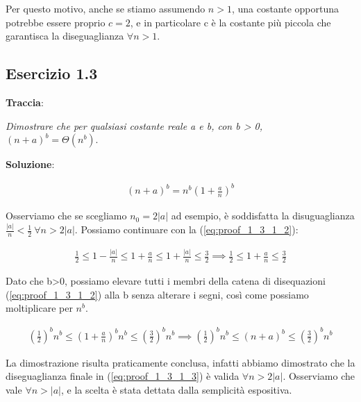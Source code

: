 \documentclass{article}
\begin{document}
\noindent
Per questo motivo, anche se stiamo assumendo $n>1$, una costante opportuna potrebbe essere proprio $c = 2$, e in particolare c è la costante più piccola che garantisca la diseguaglianza $\forall n>1$.

\subsection{Esercizio 1.3} \label{subsec:esercizio1_3}
\textbf{Traccia}:

\noindent
\textit{Dimostrare che per qualsiasi costante reale a e b, con b > 0, $(n+a)^b = \Theta(n^b)$}.
\vspace{\baselineskip}

\noindent
\textbf{Soluzione}: 

\begin{equation} \label{eq:proof_1_3_1_1}
\begin{aligned}
(n+a)^b = n^b\left( 1+\frac{a}{n} \right)^b
\end{aligned}
\end{equation}

\noindent
Osserviamo che se scegliamo $n_0 = 2|a|$ ad esempio, è soddisfatta la disuguaglianza $\frac{|a|}{n} < \frac{1}{2} \ \forall n>2|a|$. Possiamo continuare con la (\ref{eq:proof_1_3_1_2}): 

\begin{equation} \label{eq:proof_1_3_1_2}
\begin{aligned}
\frac{1}{2} \le 1 - \frac{|a|}{n} \le 1 + \frac{a}{n} \le 1 + \frac{|a|}{n} \le \frac{3}{2} \implies
\frac{1}{2} \le 1 + \frac{a}{n} \le \frac{3}{2} 
\end{aligned}
\end{equation}

\noindent
Dato che b>0, possiamo elevare tutti i membri della catena di disequazioni (\ref{eq:proof_1_3_1_2}) alla b senza alterare i segni, così come possiamo moltiplicare per $n^b$.

\begin{equation} \label{eq:proof_1_3_1_3}
\begin{aligned}
\left( \frac{1}{2}\right)^bn^b \le \left( 1 + \frac{a}{n} \right)^bn^b \le \left(\frac{3}{2}\right)^bn^b \implies \left( \frac{1}{2}\right)^bn^b \le \left( n + a \right)^b \le \left(\frac{3}{2}\right)^bn^b
\end{aligned}
\end{equation}

\noindent
La dimostrazione risulta praticamente conclusa, infatti abbiamo dimostrato che la diseguaglianza finale in (\ref{eq:proof_1_3_1_3}) è valida $\forall n>2|a|$. Osserviamo che vale $\forall n>|a|$, e la scelta è stata dettata dalla semplicità espositiva.
\end{document}
